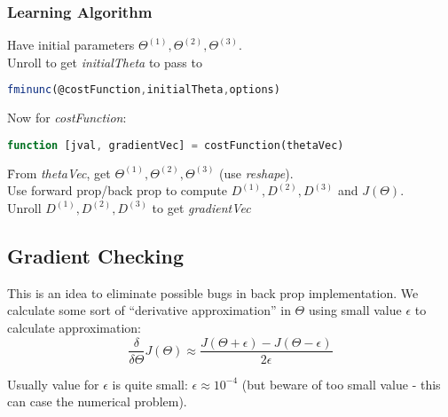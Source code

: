 \documentclass{scrartcl}
\begin{document}
\subsubsection{Learning Algorithm}
Have initial parameters $\Theta^{(1)}, \Theta^{(2)}, \Theta^{(3)}$. \\
Unroll to get {\it initialTheta} to pass to
\begin{lstlisting}[language=Octave, caption=={Plugin function }]
  fminunc(@costFunction,initialTheta,options)
\end{lstlisting}

Now for {\it costFunction}:
\begin{lstlisting}[language=Octave, caption=={Plugin function }]
  function [jval, gradientVec] = costFunction(thetaVec)
\end{lstlisting}
\begin{tabbing}
  \quad \quad \= From {\it thetaVec}, get $\Theta^{(1)}, \Theta^{(2)},
  \Theta^{(3)}$ (use {\it reshape}). \\
  \>Use forward prop/back prop to compute $D^{(1)}, D^{(2)}, D^{(3)}$
  and $J(\Theta)$. \\
  \>Unroll  $D^{(1)}, D^{(2)}, D^{(3)}$ to get {\it gradientVec}\\
\end{tabbing}

\subsection{Gradient Checking}
\label{sec:9-5}
This is an idea to eliminate possible bugs in back prop
implementation. We calculate some sort of ``derivative approximation''
in $\Theta$ using small value $\epsilon$ to calculate approximation:
\[ \frac{\delta}{\delta \Theta} J(\Theta) \approx \frac{J(\Theta +
  \epsilon) - J(\Theta - \epsilon)} { 2 \epsilon} \]

Usually value for $\epsilon$ is quite small: $\epsilon \approx
10^{-4}$ (but beware of too small value - this can case the numerical
problem).
\end{document}
